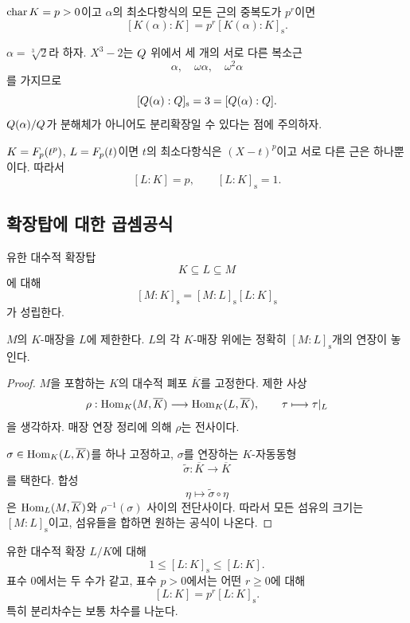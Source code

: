 \begin{corollary}
$\operatorname{char} K=p>0$이고 $\alpha$의 최소다항식의 모든 근의 중복도가 $p^r$이면
\[
  [K(\alpha):K]
  =p^r[K(\alpha):K]_{\mathrm s}.
\]
\end{corollary}

\begin{example}
$\alpha=\sqrt[3]{2}$라 하자. $X^3-2$는 $Q$ 위에서 세 개의 서로 다른 복소근
\[
  \alpha,\quad \omega\alpha,\quad \omega^2\alpha
\]
를 가지므로
\[
  [Q(\alpha):Q]_{\mathrm s}=3=[Q(\alpha):Q].
\]
$Q(\alpha)/Q$가 분해체가 아니어도 분리확장일 수 있다는 점에 주의하자.
\end{example}

\begin{example}
$K=F_p(t^p)$, $L=F_p(t)$이면 $t$의 최소다항식은 $(X-t)^p$이고 서로 다른 근은 하나뿐이다. 따라서
\[
  [L:K]=p,
  \qquad
  [L:K]_{\mathrm s}=1.
\]
\end{example}

\subsection{확장탑에 대한 곱셈공식}

\begin{theorem}
유한 대수적 확장탑
\[
  K\subseteq L\subseteq M
\]
에 대해
\[
  [M:K]_{\mathrm s}
  =[M:L]_{\mathrm s}[L:K]_{\mathrm s}
\]
가 성립한다.
\end{theorem}

\begin{proofidea}
$M$의 $K$-매장을 $L$에 제한한다. $L$의 각 $K$-매장 위에는 정확히 $[M:L]_{\mathrm s}$개의 연장이 놓인다.
\end{proofidea}

\begin{proof}
$M$을 포함하는 $K$의 대수적 폐포 $\overline K$를 고정한다. 제한 사상
\[
  \rho:\operatorname{Hom}_K(M,\overline K)
  \longrightarrow\operatorname{Hom}_K(L,\overline K),
  \qquad
  \tau\longmapsto\tau|_L
\]
을 생각하자. 매장 연장 정리에 의해 $\rho$는 전사이다.

$\sigma\in\operatorname{Hom}_K(L,\overline K)$를 하나 고정하고, $\sigma$를 연장하는 $K$-자동동형
\[
  \widetilde\sigma:\overline K\longrightarrow\overline K
\]
를 택한다. 합성
\[
  \eta\longmapsto\widetilde\sigma\circ\eta
\]
은 $\operatorname{Hom}_L(M,\overline K)$와 $\rho^{-1}(\sigma)$ 사이의 전단사이다. 따라서 모든 섬유의 크기는 $[M:L]_{\mathrm s}$이고, 섬유들을 합하면 원하는 공식이 나온다.
\end{proof}

\begin{corollary}
유한 대수적 확장 $L/K$에 대해
\[
  1\le [L:K]_{\mathrm s}\le [L:K].
\]
표수 $0$에서는 두 수가 같고, 표수 $p>0$에서는 어떤 $r\ge0$에 대해
\[
  [L:K]=p^r[L:K]_{\mathrm s}.
\]
특히 분리차수는 보통 차수를 나눈다.
\end{corollary}

